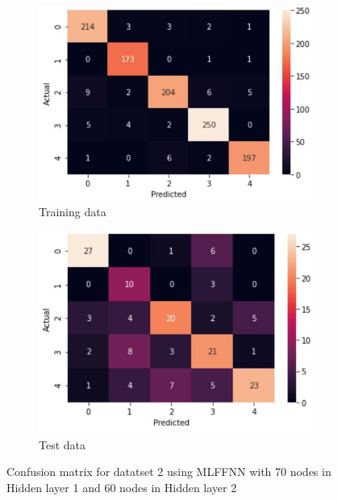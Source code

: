 \documentclass[11pt]{article}
\begin{document}
\begin{figure}[h]
\centering
	\begin{subfigure}[b]{0.45\textwidth}
	\centering
	\includegraphics[scale=0.55]{dataset2_mlffnn_cm_train.jpg}
	\caption{Training data}
	\label{fig:fig3.1.1.1}
	\end{subfigure}
	\begin{subfigure}[b]{0.45\textwidth}
	\centering
	\includegraphics[scale=0.55]{dataset2_mlffnn_cm_test.jpg}
	\caption{Test data}
	\label{fig:fig3.1.1.2}
	\end{subfigure}
\caption{Confusion matrix for datatset 2 using MLFFNN with 70 nodes in Hidden layer 1 and 60 nodes in Hidden layer 2}
\label{fig:fig3.1.1}
\end{figure}

\newpage
\end{document}
